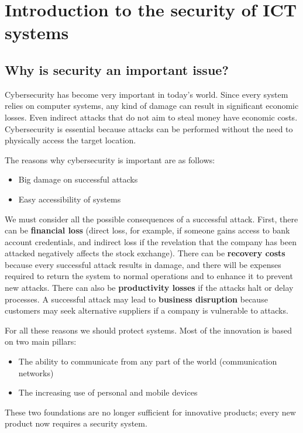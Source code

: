 \chapter{Introduction to the security of
ICT systems}

\section{Why is security an important issue?}
Cybersecurity has become very important in today's world. Since every system relies on computer systems, any kind of damage can result in significant economic losses. Even indirect attacks that do not aim to steal money have economic costs. Cybersecurity is essential because attacks can be performed without the need to physically access the target location.


The reasons why cybersecurity is important are as follows:
\begin{itemize}
  \item Big damage on successful attacks
  \item Easy accessibility of systems
\end{itemize}

We must consider all the possible consequences of a successful attack. First, there can be \textbf{financial loss} (direct loss, for example, if someone gains access to bank account credentials, and indirect loss if the revelation that the company has been attacked negatively affects the stock exchange). There can be \textbf{recovery costs} because every successful attack results in damage, and there will be expenses required to return the system to normal operations and to enhance it to prevent new attacks. There can also be \textbf{productivity losses} if the attacks halt or delay processes. A successful attack may lead to \textbf{business disruption} because customers may seek alternative suppliers if a company is vulnerable to attacks.


For all these reasons we should protect systems. Most of the innovation is based on two main pillars:
\begin{itemize}
  \item The ability to communicate from any part of the world (communication networks)
  \item The increasing use of personal and mobile devices
\end{itemize}
These two foundations are no longer sufficient for innovative products; every new product now requires a security system.


